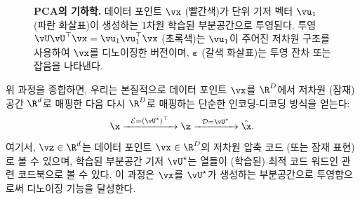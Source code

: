 \documentclass[../../book-main_ko.tex]{subfiles}
\begin{document}
\begin{figure}
    \centering
    \caption{\small \textbf{PCA의 기하학.} 데이터 포인트 $\vx$ (빨간색)가 단위 기저 벡터 $\vu_1$ (파란 화살표)이 생성하는 1차원 학습된 부분공간으로 투영된다. 투영 $\vU\vU^\top\vx = \vu_{1}\vu_{1}^{\top}\vx$ (초록색)는 $\vu_{1}$이 주어진 저차원 구조를 사용하여 $\vx$를 디노이징한 버전이며, $\boldsymbol{\varepsilon}$ (갈색 화살표)는 투영 잔차 또는 잡음을 나타낸다.}
    \label{fig:pca-geometry}
\end{figure}

위 과정을 종합하면, 우리는 본질적으로 데이터 포인트 $\vx$를 $\R^D$에서 저차원 (잠재) 공간 $\R^d$로 매핑한 다음 다시 $\R^D$로 매핑하는 단순한 인코딩-디코딩 방식을 얻는다:
\begin{equation}
\x \xrightarrow{\hspace{2mm} \mathcal{E} = (\vU^\star)^\top \hspace{2mm}}  \z
    \xrightarrow{\hspace{2mm} \mathcal{D} = \vU^\star \hspace{2mm}}   \hat{\x}.
\label{eqn:autoencoding-PCA}
\end{equation}
여기서, $\vz \in \R^d$는 데이터 포인트 $\vx \in \R^D$의 저차원 압축 코드 (또는 잠재 표현)로 볼 수 있으며, 학습된 부분공간 기저 $\vU^\star$는 열들이 (학습된) 최적 코드 워드인 관련 코드북으로 볼 수 있다. 이 과정은 $\vx$를 $\vU^\star$가 생성하는 부분공간으로 투영함으로써 디노이징 기능을 달성한다.
\end{document}
